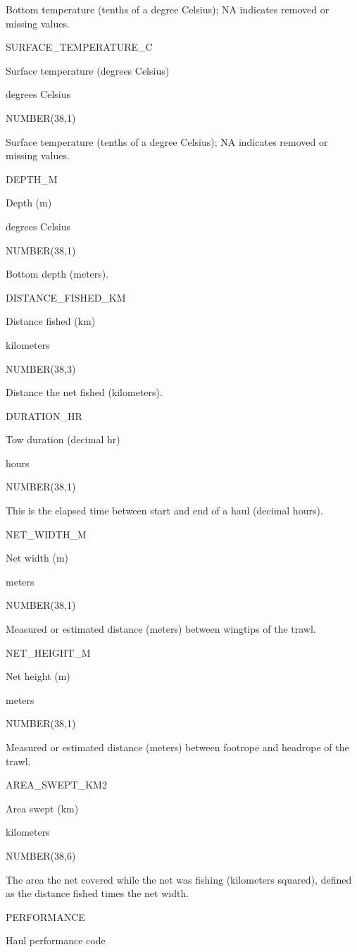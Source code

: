 \documentclass[
  letterpaper,
  oneside,
  open=any]{scrbook}
\begin{document}
Bottom temperature (tenths of a degree Celsius); NA indicates removed or
missing values.

SURFACE\_TEMPERATURE\_C

Surface temperature (degrees Celsius)

degrees Celsius

NUMBER(38,1)

Surface temperature (tenths of a degree Celsius); NA indicates removed
or missing values.

DEPTH\_M

Depth (m)

degrees Celsius

NUMBER(38,1)

Bottom depth (meters).

DISTANCE\_FISHED\_KM

Distance fished (km)

kilometers

NUMBER(38,3)

Distance the net fished (kilometers).

DURATION\_HR

Tow duration (decimal hr)

hours

NUMBER(38,1)

This is the elapsed time between start and end of a haul (decimal
hours).

NET\_WIDTH\_M

Net width (m)

meters

NUMBER(38,1)

Measured or estimated distance (meters) between wingtips of the trawl.

NET\_HEIGHT\_M

Net height (m)

meters

NUMBER(38,1)

Measured or estimated distance (meters) between footrope and headrope of
the trawl.

AREA\_SWEPT\_KM2

Area swept (km)

kilometers

NUMBER(38,6)

The area the net covered while the net was fishing (kilometers squared),
defined as the distance fished times the net width.

PERFORMANCE

Haul performance code
\end{document}
